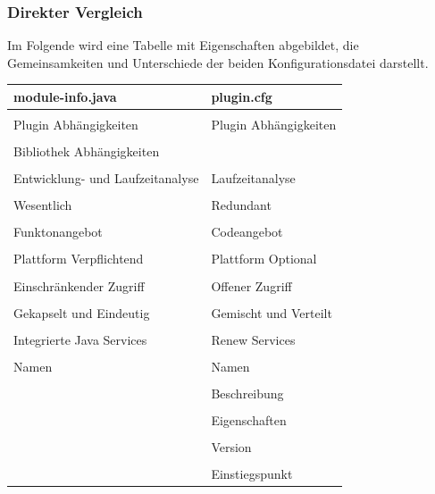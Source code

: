 		\subsubsection{Direkter Vergleich} \label{sub:Direkter_Vergleich}
			Im Folgende wird eine Tabelle mit Eigenschaften abgebildet, die Gemeinsamkeiten und Unterschiede der beiden Konfigurationsdatei darstellt.\bigbreak
			\begin{table}[!h]
			\centering
			\begin{tabular}{l|l}
				\textbf{module-info.java} & \textbf{plugin.cfg} \\
				\hline
				\\[-1em]
				Plugin Abhängigkeiten & Plugin Abhängigkeiten \\
				\\[-1em]
			    Bibliothek Abhängigkeiten & \\
			    \\[-1em]
			    Entwicklung- und Laufzeitanalyse & Laufzeitanalyse \\
			    \\[-1em]
			    Wesentlich & Redundant \\
			    \\[-1em]
			    Funktonangebot & Codeangebot \\
			    \\[-1em]
			    Plattform Verpflichtend & Plattform Optional \\
			    \\[-1em]
			    Einschränkender Zugriff & Offener Zugriff \\
			    \\[-1em]
			    Gekapselt und Eindeutig & Gemischt und Verteilt \\
			    \\[-1em]
			    Integrierte Java Services & Renew Services \\
			    \\[-1em]
			    Namen & Namen \\
			    \\[-1em]
			    & Beschreibung \\
			    \\[-1em]
			    & Eigenschaften \\
			    \\[-1em]
			    & Version \\
			    \\[-1em]
			    & Einstiegspunkt
			    \\[-1em]
			\end{tabular}
			\end{table}

